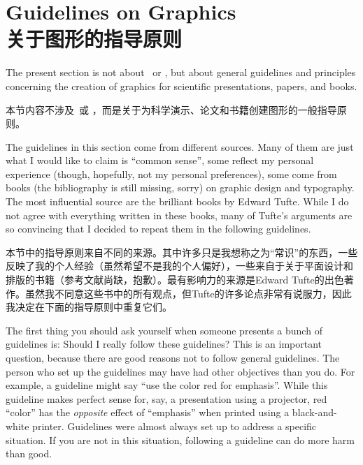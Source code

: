 %
%
%


\section{Guidelines on Graphics\\关于图形的指导原则}

The present section is not about \pgfname\ or \tikzname, but about general
guidelines and principles concerning the creation of graphics for scientific
presentations, papers, and books.

本节内容不涉及\pgfname\ 或 \tikzname，而是关于为科学演示、论文和书籍创建图形的一般指导原则。

The guidelines in this section come from different sources. Many of them are
just what I would like to claim is ``common sense'', some reflect my personal
experience (though, hopefully, not my personal preferences), some come from
books (the bibliography is still missing, sorry) on graphic design and
typography. The most influential source  are the brilliant books by Edward
Tufte. While I do not agree with everything written in these books, many of
Tufte's arguments are so convincing that I decided to repeat them in the
following guidelines.

本节中的指导原则来自不同的来源。其中许多只是我想称之为“常识”的东西，一些反映了我的个人经验（虽然希望不是我的个人偏好），一些来自于关于平面设计和排版的书籍（参考文献尚缺，抱歉）。最有影响力的来源是Edward Tufte的出色著作。虽然我不同意这些书中的所有观点，但Tufte的许多论点非常有说服力，因此我决定在下面的指导原则中重复它们。

The first thing you should ask yourself when someone presents a bunch of
guidelines is: Should I really follow these guidelines? This is an important
question, because there are good reasons not to follow general guidelines. The
person who set up the guidelines may have had other objectives than you do. For
example, a guideline might say ``use the color red for emphasis''. While this
guideline makes perfect sense for, say, a presentation using a projector, red
``color'' has the \emph{opposite} effect of ``emphasis'' when printed using a
black-and-white printer. Guidelines were almost always set up to address a
specific situation. If you are not in this situation, following a guideline can
do more harm than good.

